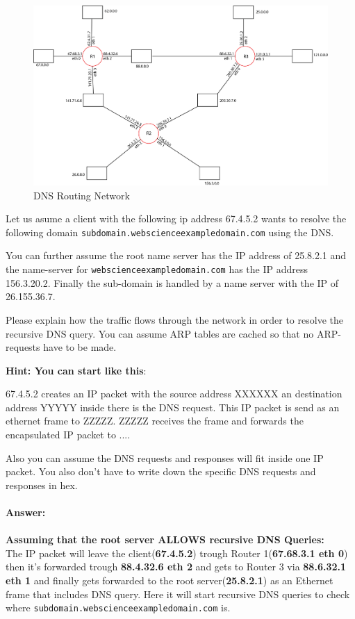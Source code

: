 \documentclass{WeSTassignment}
\begin{document}
\begin{figure}[h]
  \centering
  \includegraphics[scale=0.45]{ass3_DNS.png}
   \caption{DNS Routing Network}
     \label{fig:routing} 
\end{figure}

Let us asume a client with the following ip address 67.4.5.2 wants to resolve the following domain  \texttt{subdomain.webscienceexampledomain.com} using the DNS.

You can further assume the root name server has the IP address of 25.8.2.1 and the name-server for \texttt{webscienceexampledomain.com} has the IP address 156.3.20.2. 
Finally the sub-domain is handled by a name server with the IP of 26.155.36.7. 

Please explain how the traffic flows through the network in order to resolve the recursive DNS query. You can assume ARP tables are cached so that no ARP-requests have to be made. 

\textbf{Hint: You can start like this}: 

67.4.5.2 creates an IP packet with the source address XXXXXX an destination address YYYYY inside there is the DNS request. This IP packet is send as an ethernet frame to ZZZZZ. 
ZZZZZ receives the frame and forwards the encapsulated IP packet to ....

Also you can assume the DNS requests and responses will fit inside one IP packet. You also don't have to write down the specific DNS requests and responses in hex. \\ \textbf{\\ Answer:}
\\ \\ \textbf{Assuming that the root server ALLOWS recursive DNS Queries:} 
\\ The IP packet will leave the client(\textbf{67.4.5.2}) trough Router 1(\textbf{67.68.3.1 eth 0}) then it's forwarded trough \textbf{88.4.32.6 eth 2} and gets to Router 3 via \textbf{88.6.32.1 eth 1} and finally gets forwarded to the root server(\textbf{25.8.2.1}) as an Ethernet frame that includes DNS query. Here it will start recursive DNS queries to check where \texttt{subdomain.webscienceexampledomain.com} is.
\end{document}
